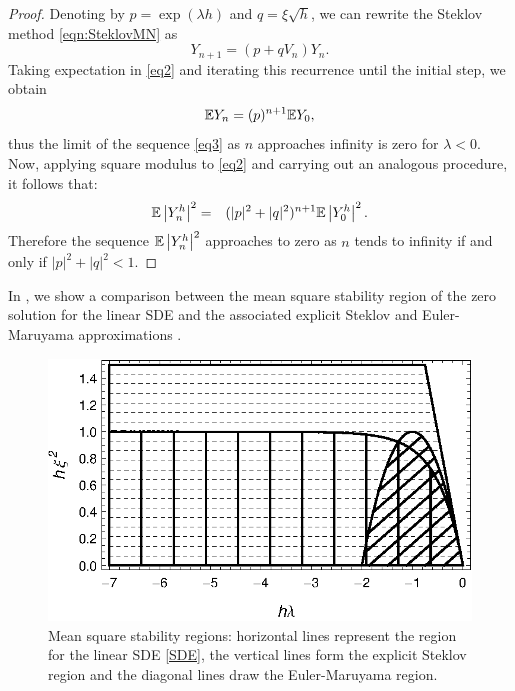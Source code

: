 	\begin{proof}
		Denoting by  $p=\exp(\lambda h)$ and  $q=\xi\sqrt{h}$, we can  rewrite the Steklov
		method \eqref{eqn:SteklovMN}  as
		\begin{equation}\label{eq2}
			Y_{n+1}=(p+qV_n)Y_n.
		\end{equation}
		Taking expectation in \eqref{eq2} and iterating this recurrence  until the initial
		step, we obtain
		\begin{equation}\label{eq3}
			\mathbb{E}Y_n=(p)^{n+1}\mathbb{E}Y_0,
		\end{equation}
		thus the limit of the sequence \eqref{eq3} as $n$ approaches infinity is zero for
		$\lambda<0$. Now, applying square modulus to \eqref{eq2}  and carrying out an
		analogous procedure, it follows that:
		\begin{eqnarray*}
			\mathbb{E}\left|Y_n^h\right|^2
			&=&(|p|^2+|q|^2)^{n+1}\mathbb{E}\left|Y_0^h\right|^2.
		\end{eqnarray*}
		Therefore the sequence $\mathbb{E}\left|Y_n^h\right|^2$ approaches to zero as $n$ tends to infinity if
		and only if  $|p|^2+|q|^2<1$.
	\end{proof}
			In , we show a comparison between the mean square stability region of
	the zero solution for the linear SDE and the associated explicit Steklov and
	Euler-Maruyama approximations  \cite{Higham2000b}.
	\begin{figure}[h!]
			\begin{center}
				\includegraphics{./papers/paperA/figures/StabilityPlotMultiplicativeNoise.eps}
			\end{center}
		\caption{
			Mean square stability regions: horizontal lines represent the region for the linear
			SDE \eqref{SDE}, the vertical lines form the explicit Steklov region and the
			diagonal lines draw the Euler-Maruyama region.
		}%
			\label{fig:1}
		\end{figure}

